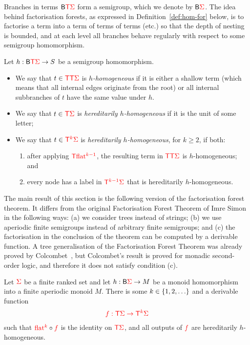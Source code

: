 Branches in  terms $\mathsf{B} {\color{red}{\mathsf T}} {\color{red}{\Sigma}}$  form a semigroup, which we denote by $\mathsf{B} {\color{red}{\Sigma}}$. 
The idea behind factorisation forests, as expressed in Definition~\ref{def:hom-for} below, is to factorise a term into a term of terms of terms (etc.) so that the depth of nesting is bounded, and at each level all branches behave regularly with respect to some semigroup homomorphism. 

\begin{definition}\label{def:hom-for}
    Let $h : \mathsf{B} {\color{red}{\mathsf T}} {\color{red}{\Sigma}} \to S$ be a semigroup homomorphism.
    \begin{itemize}
\item     We say that $t \in {\color{red}{\mathsf T}} {\color{red}{\mathsf T}} {\color{red}{\Sigma}}$ is \emph{$h$-homogeneous} if it is either a shallow term (which means that all internal edges originate from the root) or all internal subbranches of $t$ have the same value under $h$.
\item We say that  $t \in {\color{red}{\mathsf T}} {\color{red}{\Sigma}}$ is \emph{hereditarily $h$-homogeneous} if it is the unit of some letter;
\item We say that  $t \in {\color{red}{\mathsf T}}^{{\color{red}{k}}}  {\color{red}{\Sigma}}$ is \emph{hereditarily $h$-homogeneous}, for $k \ge 2$, if both:
\begin{enumerate}
    \item  after applying ${\color{red}{\mathsf T}} {\color{red}{\mathrm{flat}}}^{{\color{red}{k-1}}}$,   the resulting term in ${\color{red}{\mathsf T}} {\color{red}{\mathsf T}} {\color{red}{\Sigma}}$ is $h$-homogeneous; and 
    \item every node has a label in ${\color{red}{\mathsf T}}^{{\color{red}{k-1}}} {\color{red}{\Sigma}}$ that is hereditarily $h$-homogeneous. 
\end{enumerate}
    \end{itemize}
\end{definition}

The main result of this section is the following version of the factorisation forest theorem. It differs from the original Factorisation Forest Theorem of Imre Simon in the following ways: (a) we consider trees instead of strings; (b) we use aperiodic finite semigroups instead of arbitrary finite semigroups; and (c) the factorisation in the conclusion of the theorem can be computed by a derivable function.  A tree generalisation of the Factorisation Forest Theorem was already proved by Colcombet~\cite[Theorem 1 and Section 3.3]{colcombetCombinatorialTheoremTrees2007}, but Colcombet's result is proved for monadic second-order logic, and therefore it does not satisfy condition (c). 
\begin{theorem}\label{thm:factfor}
    Let ${\color{red}{\Sigma}}$ be a finite ranked set and let $h : \mathsf{B} {\color{red}{\Sigma}} \to M$ be a monoid homomorphism into a finite aperiodic monoid $M$. There is some $k \in \{1,2,\ldots\}$ and a derivable function
    \begin{align*}
        {\color{red}{f : {\color{red}{\mathsf T}}{\color{red}{\Sigma}}\to {\color{red}{\mathsf T}}^k {\color{red}{\Sigma}}}}  
    \end{align*}
such that ${\color{red}{\mathrm{flat}}}^{{\color{red}{k}}} \circ {\color{red}{f}}$ is the identity on ${\color{red}{\mathsf T}} {\color{red}{\Sigma}}$, and  all outputs of  ${\color{red}{f}}$ are hereditarily $h$-homogeneous.
\end{theorem}



